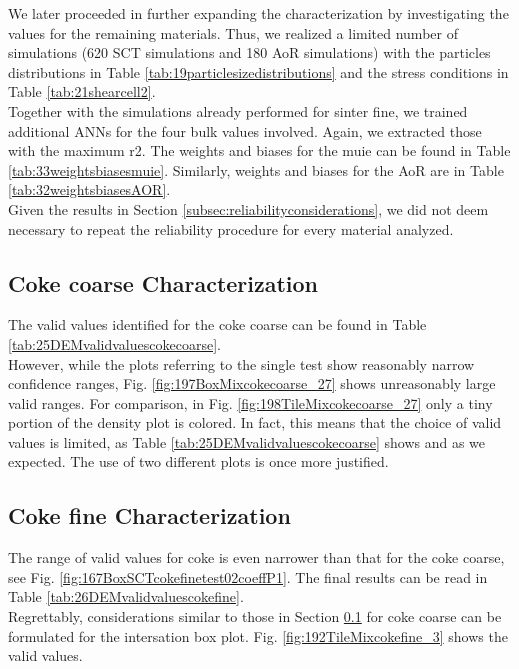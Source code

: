 We later proceeded in further expanding the characterization by investigating
the values for the remaining materials.
Thus, we realized a limited number of simulations (620 \acs{SCT} simulations
and 180 \acs{AoR} simulations) with the particles distributions in Table
\ref{tab:19particlesizedistributions} and the stress conditions in Table
\ref{tab:21shearcell2}.\\
Together with the simulations already performed for sinter fine, we trained
additional \acs{ANNs} for the four bulk values involved.
Again, we extracted those with the maximum \acs{r2}.
The weights and biases for the \acs{muie} can be found in Table
\ref{tab:33weightsbiasesmuie}.
Similarly, weights and biases for the \acs{AoR} are in Table
\ref{tab:32weightsbiasesAOR}.\\
Given the results in Section \ref{subsec:reliabilityconsiderations}, we did not
deem necessary to repeat the reliability procedure for every material analyzed.





\subsection{Coke coarse Characterization}
\label{subsec:cokecoarsecharacterization}

The valid values identified for the coke coarse can be found in Table
\ref{tab:25DEMvalidvaluescokecoarse}.\\
However, while the plots referring to the single test show reasonably narrow
confidence ranges, Fig. \ref{fig:197BoxMixcokecoarse_27} shows unreasonably
large valid ranges.
For comparison, in Fig. \ref{fig:198TileMixcokecoarse_27} only a tiny portion of
the density plot is colored.
In fact, this means that the choice of valid values is limited, as Table
\ref{tab:25DEMvalidvaluescokecoarse} shows and as we expected.
The use of two different plots is once more justified.


%


\subsection{Coke fine Characterization}
\label{subsec:cokefinecharacterization}

The range of valid values for coke is even narrower than that for the coke
coarse, see Fig. \ref{fig:167BoxSCTcokefinetest02coeffP1}.
The final results can be read in Table \ref{tab:26DEMvalidvaluescokefine}.\\
Regrettably, considerations similar to those in Section
\ref{subsec:cokecoarsecharacterization} for coke coarse can be formulated for
the intersation box plot.
Fig. \ref{fig:192TileMixcokefine_3} shows the valid values.


